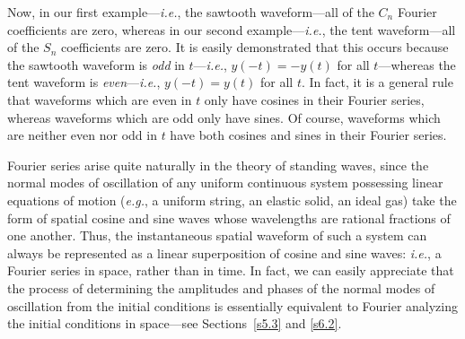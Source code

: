 Now, in our first example---{\em i.e.}, the sawtooth waveform---all of the
$C_n$ Fourier coefficients are zero, whereas in our second example---{\em i.e.}, the
tent waveform---all of the $S_n$ coefficients are zero. It is easily
demonstrated that  this occurs because the sawtooth waveform is {\em odd}\/ in $t$---{\em i.e.},
$y(-t)=-y(t)$ for all $t$---whereas the tent waveform is {\em even}---{\em i.e.},
$y(-t)=y(t)$ for all $t$. In fact, it is a general rule that  waveforms which are even in $t$ only
have cosines in their Fourier series, whereas  waveforms which are odd only have sines. Of course, waveforms
which are neither even nor odd in $t$ have both cosines and sines in their Fourier
series. 

Fourier series arise quite naturally in the theory of standing waves, since the normal
modes of oscillation of any uniform continuous system possessing linear equations of motion
({\em e.g.}, a uniform string, an elastic solid, an ideal gas) take the form of spatial cosine and
sine waves whose wavelengths are rational fractions of one another. Thus, the  instantaneous spatial waveform of such a system can always
be represented as a linear superposition of cosine and sine waves: {\em i.e.}, a Fourier
series in space, rather than in time. In fact, we can easily appreciate that the
process of determining the amplitudes and phases of the normal modes of oscillation 
from the
initial conditions is essentially equivalent to Fourier analyzing the initial conditions
in space---see Sections~\ref{s5.3} and \ref{s6.2}.

